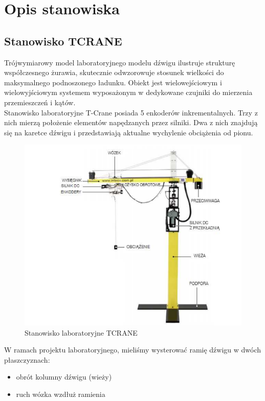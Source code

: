 \documentclass{mwrep}
\begin{document}
\tableofcontents


\chapter{Opis stanowiska}
\label{Opis}

\section{Stanowisko TCRANE}
\label{Opis::TCRANE}
Trójwymiarowy model laboratoryjnego modelu dźwigu ilustruje strukturę współczesnego 
żurawia, skutecznie odwzorowuje stosunek wielkości do maksymalnego podnoszonego 
ładunku. Obiekt jest wielowejściowym i wielowyjściowym systemem wyposażonym w dedykowane
czujniki do mierzenia przemieszczeń i kątów.\\
\indent Stanowisko laboratoryjne T-Crane posiada 5 enkoderów inkrementalnych. Trzy z nich
mierzą położenie elementów napędzanych przez silniki. Dwa z nich znajdują się na karetce
dźwigu i przedstawiają aktualne wychylenie obciążenia od pionu.

\begin{figure}[H]
    \label{Opis::TCRANE::Stanowisko}
    \centering
    \includegraphics[scale=0.5]{tcrane.png}
    \caption{Stanowisko laboratoryjne TCRANE}
\end{figure}

W ramach projektu laboratoryjnego, mieliśmy wysterować ramię dźwigu w dwóch płaszczyznach:

\begin{itemize}
    \item obrót kolumny dźwigu (wieży)
    \item ruch wózka wzdłuż ramienia
\end{itemize}
\end{document}
